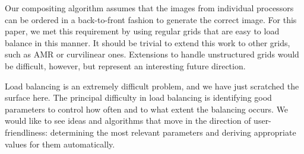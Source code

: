Our compositing algorithm assumes that the images from individual
processors can be ordered in a back-to-front fashion to generate the
correct image. For this paper, we met this requirement by using regular
grids that are easy to load balance in this manner. It should be
trivial to extend this work to other grids, such as AMR or curvilinear
ones.  Extensions to handle unstructured grids would be difficult,
however, but represent an interesting future direction.

Load balancing is an extremely difficult problem, and we have just
scratched the surface here. The principal difficulty in load balancing
is identifying good parameters to control how often and to what extent
the balancing occurs. We would like to see ideas and algorithms
that move in the direction of user-friendliness: determining the
most relevant parameters and deriving appropriate values for them
automatically.

